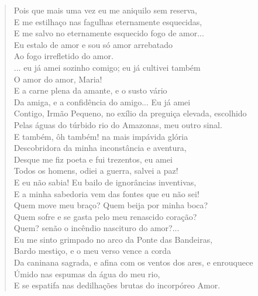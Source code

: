 \begin{verse}
Pois que mais uma vez eu me aniquilo sem reserva,\\
E me estilhaço nas fagulhas eternamente esquecidas,\\
E me salvo no eternamente esquecido fogo de amor...\\
Eu estalo de amor e sou só amor arrebatado\\
Ao fogo irrefletido do amor.\\
... eu já amei sozinho comigo; eu já cultivei também\\
O amor do amor, Maria!\\
E a carne plena da amante, e o susto vário\\
Da amiga, e a confidência do amigo... Eu já amei\\
Contigo, Irmão Pequeno, no exílio da preguiça elevada, escolhido\\
Pelas águas do túrbido rio do Amazonas, meu outro sinal.\\
E também, ôh também! na mais impávida glória\\
Descobridora da minha inconstância e aventura,\\
Desque me fiz poeta e fui trezentos, eu amei\\
Todos os homens, odiei a guerra, salvei a paz!\\
E eu não sabia! Eu bailo de ignorâncias inventivas,\\
E a minha sabedoria vem das fontes que eu não sei!\\
Quem move meu braço? Quem beija por minha boca?\\
Quem sofre e se gasta pelo meu renascido coração?\\
Quem? senão o incêndio nascituro do amor?...\\
Eu me sinto grimpado no arco da Ponte das Bandeiras,\\
Bardo mestiço, e o meu verso vence a corda\\
Da caninana sagrada, e afina com os ventos dos ares, e enrouquece\\
Úmido nas espumas da água do meu rio,\\
E se espatifa nas dedilhações brutas do incorpóreo Amor.


\end{verse}
